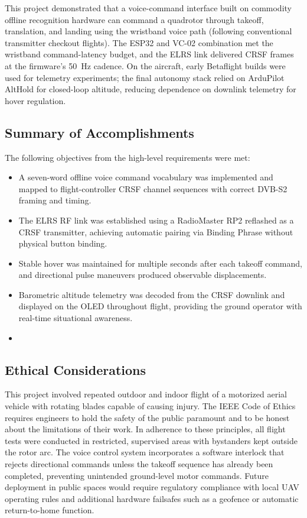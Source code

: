 This project demonstrated that a voice-command interface built on commodity offline recognition
hardware can command a quadrotor through takeoff, translation, and landing using the wristband
voice path (following conventional transmitter checkout flights).
The ESP32 and VC-02 combination met the wristband command-latency budget, and the ELRS link
delivered CRSF frames at the firmware's 50~Hz cadence.
On the aircraft, early Betaflight builds were used for telemetry experiments; the final autonomy
stack relied on ArduPilot AltHold for closed-loop altitude, reducing dependence on downlink
telemetry for hover regulation.

\subsection{Summary of Accomplishments}

The following objectives from the high-level requirements were met:

\begin{itemize}
    \item A seven-word offline voice command vocabulary was implemented and mapped to
          flight-controller CRSF channel sequences with correct DVB-S2 framing and timing.
    \item The ELRS RF link was established using a RadioMaster RP2 reflashed as a CRSF
          transmitter, achieving automatic pairing via Binding Phrase without physical button
          binding.
    \item Stable hover was maintained for multiple seconds after each takeoff command, and
          directional pulse maneuvers produced observable displacements.
    \item Barometric altitude telemetry was decoded from the CRSF downlink and displayed on
          the OLED throughout flight, providing the ground operator with real-time situational
          awareness.
    \item %
\end{itemize}

\subsection{Ethical Considerations}

This project involved repeated outdoor and indoor flight of a motorized aerial vehicle with
rotating blades capable of causing injury.
The IEEE Code of Ethics \cite{ieee-ethics} requires engineers to hold the safety of the public
paramount and to be honest about the limitations of their work.
In adherence to these principles, all flight tests were conducted in restricted, supervised areas
with bystanders kept outside the rotor arc.
The voice control system incorporates a software interlock that rejects directional commands
unless the takeoff sequence has already been completed, preventing unintended ground-level
motor commands.
Future deployment in public spaces would require regulatory compliance with local UAV
operating rules and additional hardware failsafes such as a geofence or automatic return-to-home
function.

